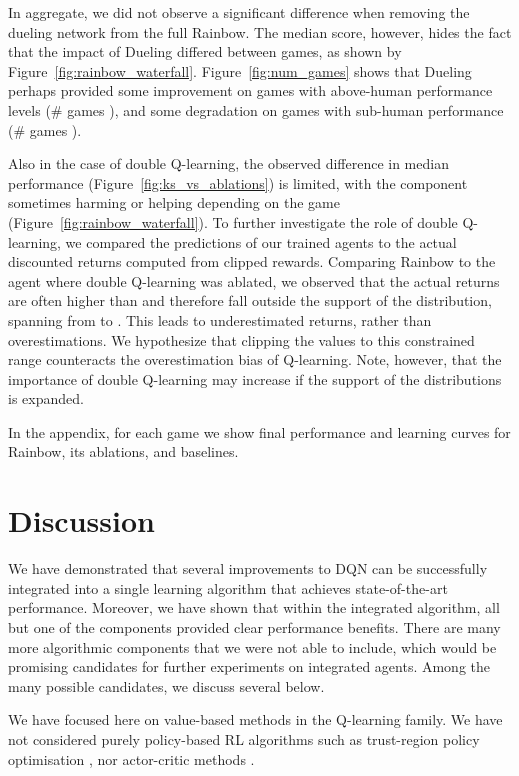 \documentclass[letterpaper]{article} \usepackage{aaai18}  \usepackage{times}  \usepackage{helvet}  \usepackage{courier}  \usepackage{url}  \usepackage{graphicx}  \usepackage{amsmath,amssymb}
\begin{document}
In aggregate, we did not observe a significant difference when removing the dueling network from the full Rainbow. The median score, however, hides the fact that the impact of Dueling differed between games, as shown by Figure~\ref{fig:rainbow_waterfall}. Figure~\ref{fig:num_games} shows that Dueling perhaps provided some improvement on games with above-human performance levels (\# games ), and some degradation on games with sub-human performance (\# games ). 

Also in the case of double Q-learning, the observed difference in median performance (Figure~\ref{fig:ks_vs_ablations}) is limited, with the component sometimes harming or helping depending on the game (Figure~\ref{fig:rainbow_waterfall}). To further investigate the role of double Q-learning, we compared the predictions of our trained agents to the actual discounted returns computed from clipped rewards. Comparing Rainbow to the agent where double Q-learning was ablated, we observed that the actual returns are often higher than  and therefore fall outside the support of the distribution, spanning from  to .  This leads to underestimated returns, rather than overestimations.
We hypothesize that clipping the values to this constrained range counteracts the overestimation bias of Q-learning. Note, however, that the importance of double Q-learning may increase if the support of the distributions is expanded.

In the appendix, for each game we show final performance and learning curves for Rainbow, its ablations, and baselines.


\section{Discussion}

We have demonstrated that several improvements to DQN can be successfully integrated into a single learning algorithm that achieves state-of-the-art performance.  Moreover, we have shown that within the integrated algorithm, all but one of the components provided clear performance benefits.
There are many more algorithmic components that we were not able to include, which would be promising candidates for further experiments on integrated agents. Among the many possible candidates, we discuss several below.

We have focused here on value-based methods in the Q-learning family. We have not considered purely policy-based RL algorithms such as trust-region policy optimisation \cite{TRPO}, nor actor-critic methods \cite{Mnih:2016,ODonoghue2016PGQCP}. 
\end{document}
